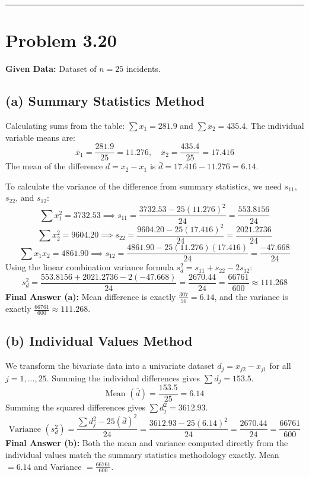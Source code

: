 \documentclass[12pt]{article}
\begin{document}
\rule{\textwidth}{0.4pt}

\section*{Problem 3.20}
\textbf{Given Data:} Dataset of $n=25$ incidents.

\subsection*{(a) Summary Statistics Method}
Calculating sums from the table: $\sum x_1 = 281.9$ and $\sum x_2 = 435.4$. 
The individual variable means are:
$$ \bar{x}_1 = \frac{281.9}{25} = 11.276, \quad \bar{x}_2 = \frac{435.4}{25} = 17.416 $$
The mean of the difference $d = x_2 - x_1$ is $\bar{d} = 17.416 - 11.276 = 6.14$.

To calculate the variance of the difference from summary statistics, we need $s_{11}$, $s_{22}$, and $s_{12}$:
$$ \sum x_1^2 = 3732.53 \implies s_{11} = \frac{3732.53 - 25(11.276)^2}{24} = \frac{553.8156}{24} $$
$$ \sum x_2^2 = 9604.20 \implies s_{22} = \frac{9604.20 - 25(17.416)^2}{24} = \frac{2021.2736}{24} $$
$$ \sum x_1 x_2 = 4861.90 \implies s_{12} = \frac{4861.90 - 25(11.276)(17.416)}{24} = \frac{-47.668}{24} $$
Using the linear combination variance formula $s_d^2 = s_{11} + s_{22} - 2s_{12}$:
$$ s_d^2 = \frac{553.8156 + 2021.2736 - 2(-47.668)}{24} = \frac{2670.44}{24} = \frac{66761}{600} \approx 111.268 $$
\textbf{Final Answer (a):} Mean difference is exactly $\frac{307}{50} = 6.14$, and the variance is exactly $\frac{66761}{600} \approx 111.268$.

\subsection*{(b) Individual Values Method}
We transform the bivariate data into a univariate dataset $d_j = x_{j2} - x_{j1}$ for all $j=1, \dots, 25$. 
Summing the individual differences gives $\sum d_j = 153.5$. 
$$ \text{Mean } (\bar{d}) = \frac{153.5}{25} = 6.14 $$
Summing the squared differences gives $\sum d_j^2 = 3612.93$. 
$$ \text{Variance } (s_d^2) = \frac{\sum d_j^2 - 25(\bar{d})^2}{24} = \frac{3612.93 - 25(6.14)^2}{24} = \frac{2670.44}{24} = \frac{66761}{600} $$
\textbf{Final Answer (b):} Both the mean and variance computed directly from the individual values match the summary statistics methodology exactly. Mean $= 6.14$ and Variance $= \frac{66761}{600}$.
\end{document}
